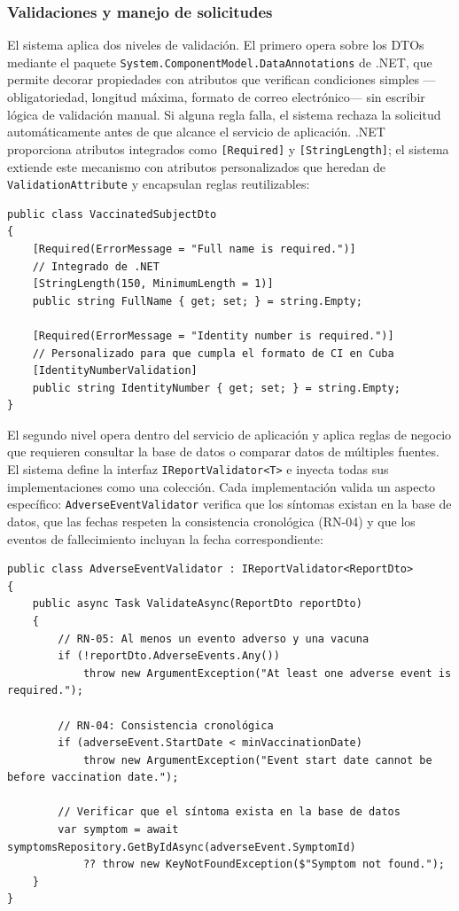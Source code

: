 \subsubsection{Validaciones y manejo de solicitudes}
El sistema aplica dos niveles de validación. El primero opera sobre los DTOs mediante el paquete \texttt{System.ComponentModel.DataAnnotations} de .NET, que permite decorar propiedades con atributos que verifican condiciones simples —obligatoriedad, longitud máxima, formato de correo electrónico— sin escribir lógica de validación manual. 
Si alguna regla falla, el sistema rechaza la solicitud automáticamente antes de que alcance el servicio de aplicación.
.NET proporciona atributos integrados como \texttt{[Required]} y \texttt{[StringLength]}; el sistema extiende este mecanismo con atributos personalizados que heredan de \texttt{ValidationAttribute} y encapsulan reglas reutilizables:

\begin{lstlisting}[language={[Sharp]C}, caption={Atributos de validación integrados y personalizados}, label={lst:validation}]
public class VaccinatedSubjectDto
{
    [Required(ErrorMessage = "Full name is required.")]       
    // Integrado de .NET
    [StringLength(150, MinimumLength = 1)]
    public string FullName { get; set; } = string.Empty;

    [Required(ErrorMessage = "Identity number is required.")]
    // Personalizado para que cumpla el formato de CI en Cuba
    [IdentityNumberValidation]                                
    public string IdentityNumber { get; set; } = string.Empty;
}
\end{lstlisting}

El segundo nivel opera dentro del servicio de aplicación y aplica reglas de negocio que requieren consultar la base de datos o comparar datos de múltiples fuentes. El sistema define la interfaz \texttt{IReportValidator<T>} e inyecta todas sus implementaciones como una colección. Cada implementación valida un aspecto específico: \texttt{AdverseEventValidator} verifica que los síntomas existan en la base de datos, que las fechas respeten la consistencia cronológica (RN-04) y que los eventos de fallecimiento incluyan la fecha correspondiente:

\begin{lstlisting}[language={[Sharp]C}, caption={Validador de eventos adversos}, label={lst:adverse_event_validator}]
public class AdverseEventValidator : IReportValidator<ReportDto>
{
    public async Task ValidateAsync(ReportDto reportDto)
    {
        // RN-05: Al menos un evento adverso y una vacuna
        if (!reportDto.AdverseEvents.Any())
            throw new ArgumentException("At least one adverse event is required.");

        // RN-04: Consistencia cronológica
        if (adverseEvent.StartDate < minVaccinationDate)
            throw new ArgumentException("Event start date cannot be before vaccination date.");

        // Verificar que el síntoma exista en la base de datos
        var symptom = await symptomsRepository.GetByIdAsync(adverseEvent.SymptomId)
            ?? throw new KeyNotFoundException($"Symptom not found.");
    }
}
\end{lstlisting}

